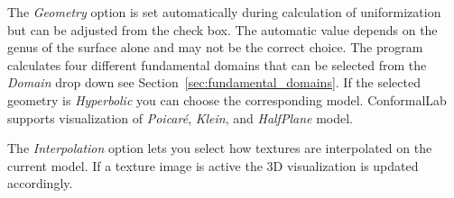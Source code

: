 \documentclass[Thesis.tex]{subfiles}
\begin{document}
The \emph{Geometry} option is set automatically during calculation of uniformization but can be adjusted from the check box. The automatic value depends on the genus of the surface alone and may not be the correct choice. The program calculates four different fundamental domains that can be selected from the \emph{Domain} drop down see Section~\ref{sec:fundamental_domains}. If the selected geometry is \emph{Hyperbolic} you can choose the corresponding model. {\sc ConformalLab} supports visualization of \emph{Poicar\'e}, \emph{Klein}, and \emph{HalfPlane} model.

The \emph{Interpolation} option lets you select how textures are interpolated on the current model. 
If a texture image is active the 3D visualization is updated accordingly.


\subfilebibliography
\end{document}
